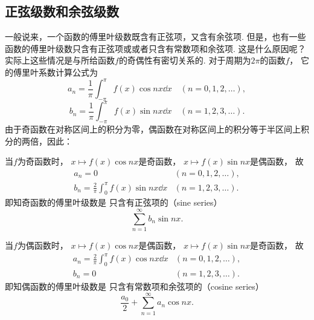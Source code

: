 \subsection{正弦级数和余弦级数}
一般说来，一个函数的傅里叶级数既含有正弦项，又含有余弦项.
但是，也有一些函数的傅里叶级数只含有正弦项或或者只含有常数项和余弦项.
这是什么原因呢？实际上这些情况是与所给函数\(f\)的奇偶性有密切关系的.
对于周期为\(2\pi\)的函数\(f\)，
它的傅里叶系数计算公式为\begin{equation*}
	a_n = \frac{1}{\pi} \int_{-\pi}^\pi f(x) \cos nx \dd{x} \quad(n=0,1,2,\dotsc),
\end{equation*}\begin{equation*}
	b_n = \frac{1}{\pi} \int_{-\pi}^\pi f(x) \sin nx \dd{x} \quad(n=1,2,3,\dotsc).
\end{equation*}
由于奇函数在对称区间上的积分为零，偶函数在对称区间上的积分等于半区间上积分的两倍，因此：

当\(f\)为奇函数时，
\(x \mapsto f(x) \cos nx\)是奇函数，
\(x \mapsto f(x) \sin nx\)是偶函数，
故\begin{equation*}
	\begin{array}{ll}
		a_n = 0 & (n=0,1,2,\dotsc), \\
		b_n = \frac{2}{\pi} \int_0^\pi f(x) \sin nx \dd{x} & (n=1,2,3,\dotsc).
	\end{array}
\end{equation*}
即知奇函数的傅里叶级数是
只含有正弦项的（sine series）\begin{equation*}
	\sum_{n=1}^\infty b_n \sin nx.
\end{equation*}

当\(f\)为偶函数时，
\(x \mapsto f(x) \cos nx\)是偶函数，
\(x \mapsto f(x) \sin nx\)是奇函数，
故\begin{equation*}
	\begin{array}{ll}
		a_n = \frac{2}{\pi} \int_0^\pi f(x) \cos nx \dd{x} & (n=0,1,2,\dotsc), \\
		b_n = 0 & (n=1,2,3,\dotsc).
	\end{array}
\end{equation*}
即知偶函数的傅里叶级数是
只含有常数项和余弦项的（cosine series）\begin{equation*}
	\frac{a_0}{2} + \sum_{n=1}^\infty a_n \cos{nx}.
\end{equation*}


